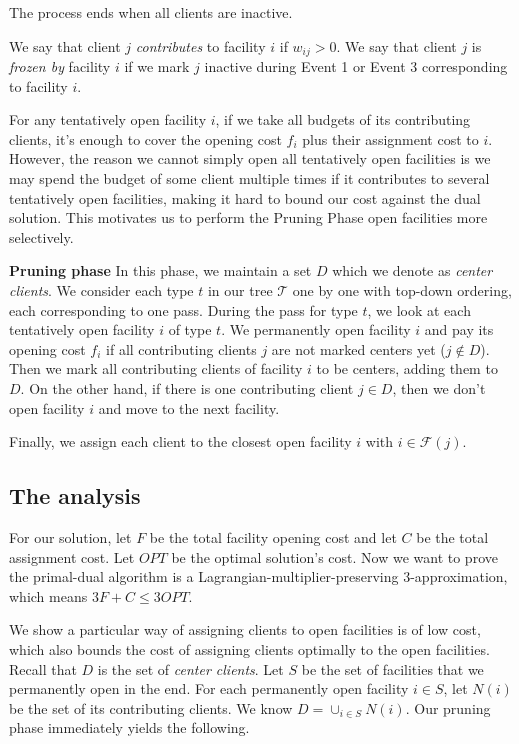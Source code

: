 The process ends when all clients are inactive.

\begin{defn}
We say that client $j$ {\it contributes} to facility $i$ if $w_{ij} > 0$.
We say that client $j$ is {\it frozen by} facility $i$ if we mark $j$ inactive during Event 1 or Event 3 corresponding to facility $i$.
\end{defn}

For any tentatively open facility $i$, if we take all budgets of its contributing clients, it's enough to cover the opening cost $f_i$ plus their assignment cost to $i$. However, the reason we cannot simply open all tentatively open facilities is we may spend the budget of some client multiple times if it contributes to several tentatively open facilities, making it hard to bound our cost against the dual solution. This motivates us to perform the Pruning Phase open facilities more selectively.

\textbf{Pruning phase}
In this phase, we maintain a set $D$ which we denote as \textit{center clients}. We consider each type $t$ in our tree $\mathcal{T}$ one by one with top-down ordering, each corresponding to one pass. During the pass for type $t$, we look at each tentatively open facility $i$ of type $t$. We permanently open facility $i$ and pay its opening cost $f_i$ if all contributing clients $j$ are not marked centers yet ($j \not \in D$). Then we mark all contributing clients of facility $i$ to be centers, adding them to $D$. On the other hand, if there is one contributing client $j \in D$, then we don't open facility $i$ and move to the next facility.

Finally, we assign each client to the closest open facility $i$ with $i \in \mathcal{F}(j)$.

\subsection{The analysis}

For our solution, let $F$ be the total facility opening cost and let $C$ be the total assignment cost.
Let $OPT$ be the optimal solution's cost.
Now we want to prove the primal-dual algorithm is a Lagrangian-multiplier-preserving 3-approximation, which means
$3F + C \le 3 OPT$. 

We show a particular way of assigning clients to open facilities is of low cost, which also
bounds the cost of assigning clients optimally to the open facilities. 
%
Recall that $D$ is the set of \textit{center clients}. Let $S$ be the set of facilities
that we permanently open in the end. For each permanently open facility $i \in S$, let
$N(i)$ be the set of its contributing clients. We know $D = \cup_{i \in S} N(i)$. Our
pruning phase immediately yields the following.


